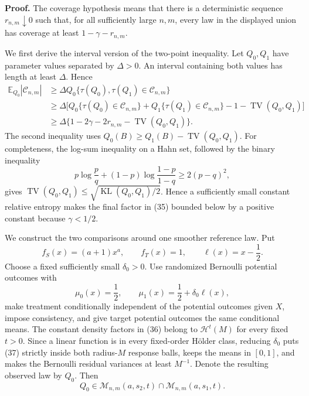 \textbf{Proof.}
The coverage hypothesis means that there is a deterministic sequence \(r_{n,m}\downarrow0\) such that, for all sufficiently large \(n,m\), every law in the displayed union has coverage at least \(1-\gamma-r_{n,m}\).

We first derive the interval version of the two-point inequality.  Let \(Q_0,Q_1\) have parameter values separated by \(\Delta>0\).  An interval containing both values has length at least \(\Delta\).  Hence
\[
\begin{aligned}
\mathbb E_{Q_0}|\mathcal C_{n,m}|
&\ge\Delta Q_0\{\tau(Q_0),\tau(Q_1)\in\mathcal C_{n,m}\}\\
&\ge\Delta\bigl[Q_0\{\tau(Q_0)\in\mathcal C_{n,m}\}
+Q_1\{\tau(Q_1)\in\mathcal C_{n,m}\}
-1-\operatorname{TV}(Q_0,Q_1)\bigr]\\
&\ge\Delta\{1-2\gamma-2r_{n,m}-\operatorname{TV}(Q_0,Q_1)\}.
\end{aligned}
\tag{35}
\]
The second inequality uses \(Q_0(B)\ge Q_1(B)-\operatorname{TV}(Q_0,Q_1)\).  For completeness, the log-sum inequality on a Hahn set, followed by the binary inequality
\[
p\log\frac pq+(1-p)\log\frac{1-p}{1-q}\ge2(p-q)^2,
\]
gives \(\operatorname{TV}(Q_0,Q_1)\le\sqrt{\operatorname{KL}(Q_0,Q_1)/2}\).  Hence a sufficiently small constant relative entropy makes the final factor in (35) bounded below by a positive constant because \(\gamma<1/2\).

We construct the two comparisons around one smoother reference law.  Put
\[
f_S(x)=(a+1)x^a,
\qquad
f_T(x)=1,
\qquad
\ell(x)=x-\frac12.
\tag{36}
\]
Choose a fixed sufficiently small \(\delta_0>0\).  Use randomized Bernoulli potential outcomes with
\[
\mu_0(x)=\frac12,
\qquad
\mu_1(x)=\frac12+\delta_0\ell(x),
\tag{37}
\]
make treatment conditionally independent of the potential outcomes given \(X\), impose consistency, and give target potential outcomes the same conditional means.  The constant density factors in (36) belong to \(\mathcal H^t(M)\) for every fixed \(t>0\).  Since a linear function is in every fixed-order H\"older class, reducing \(\delta_0\) puts (37) strictly inside both radius-\(M\) response balls, keeps the means in \([0,1]\), and makes the Bernoulli residual variances at least \(M^{-1}\).  Denote the resulting observed law by \(Q_0\).  Then
\[
Q_0\in\mathcal M_{n,m}(a,s_2,t)
\cap\mathcal M_{n,m}(a,s_1,t).
\tag{38}
\]

